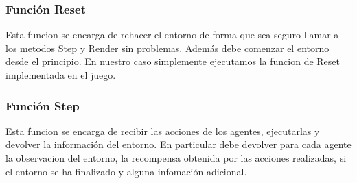 \subsubsection*{Función Reset}

Esta funcion se encarga de rehacer el entorno de forma que sea seguro llamar a los metodos Step y Render sin problemas. Además debe comenzar el entorno desde el principio. En nuestro caso simplemente ejecutamos la funcion de Reset implementada en el juego.

\subsubsection*{Función Step}

Esta funcion se encarga de recibir las acciones de los agentes, ejecutarlas y devolver la información del entorno. En particular debe devolver para cada agente la observacion del entorno, la recompensa obtenida por las acciones realizadas, si el entorno se ha finalizado y alguna infomación adicional.
